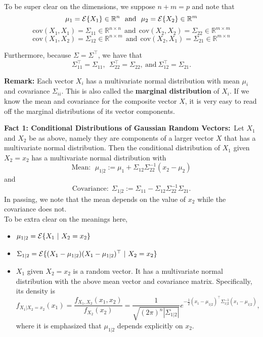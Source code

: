 \documentclass[letterpaper]{article}
\newcommand{\real}{\mathbb R}  %
\newcommand{\cov}{\mathrm{cov}}
\begin{document}
To be super clear on the dimensions, we suppose $n+m=p$ and note that
$$\mu_1 =  {\cal E} \{ X_1\} \in \real^n~~\text{and}~~\mu_2 =  {\cal E} \{ X_2\} \in \real^m$$
$$\cov(X_1,X_1) = \Sigma_{11} \in \real^{n \times n}~~\text{and}~~\cov(X_2,X_2) = \Sigma_{22} \in \real^{m \times m}$$
$$\cov(X_1,X_2) = \Sigma_{12} \in \real^{n \times m}~~\text{and}~~\cov(X_2,X_1) = \Sigma_{21} \in \real^{m \times n}$$

Furthermore, because $\Sigma=\Sigma^\top$, we have that
$$\Sigma_{11}^\top = \Sigma_{11},~~\Sigma_{22}^\top = \Sigma_{22},~\text{and} ~\Sigma_{12}^\top = \Sigma_{21}.$$

\noindent \textbf{Remark:} Each vector  $X_i$ has a multivariate normal distribution with mean $\mu_i$ and covariance $\Sigma_{ii}$. This is also called the \textbf{marginal distribution} of $X_i$. If we know the mean and covariance for the composite vector $X$, it is very easy to read off the marginal distributions of its vector components.
\newpage

\noindent \textbf{Fact 1: Conditional Distributions of Gaussian Random Vectors:}~Let $X_1$ and $X_2$ be as above, namely they are components of a larger vector $X$ that has a multivariate normal distribution. Then the conditional distribution of $X_1$ given $X_2 = x_2$ has a multivariate normal distribution with
$$\text{Mean}:~~ \mu_{1|2}:= \mu_1 + \Sigma_{12} \Sigma_{22}^{-1} (x_2 - \mu_2)$$
and
$$\text{Covariance:}~~ \Sigma_{1|2}:= \Sigma_{11}-\Sigma_{12} \Sigma_{22}^{-1}\Sigma_{21}.$$
In passing, we note that the mean depends on the value of $x_2$ while the covariance does not.\\

To be extra clear on the meanings here,
\begin{itemize}
\setlength{\itemsep}{.4cm}
\item $ \mu_{1|2} = {\cal E} \{ X_1~|~X_2 = x_2\}$
\item $ \Sigma_{1|2} = {\cal E} \{ (X_1-\mu_{1|2}) (X_1-\mu_{1|2})^\top~| ~X_2=x_2 \} $
\item $X_1$ given $X_2=x_2$ is a random vector. It has a multivariate normal distribution with the above mean vector and covariance matrix. Specifically, its density is
    $$f_{X_1|X_2=x_2}(x_1) = \frac{f_{X_1,X_2}(x_1,x_2) }{f_{X_2}(x_2)} = \frac{1}{\sqrt{(2 \pi)^{n} |\Sigma_{1|2}| } } e^{ -\frac{1}{2} (x_1-\mu_{1|2})^\top \Sigma_{1|2}^{-1}(x_1-\mu_{1|2}) }, $$
    where it is emphasized that $\mu_{1|2}$ depends explicitly on $x_2$.
\end{itemize}
\end{document}
